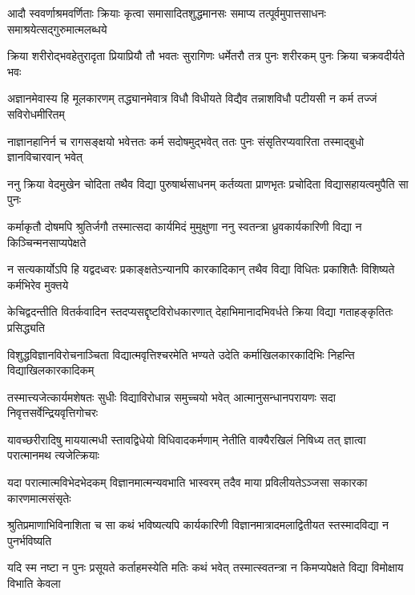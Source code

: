 \fourlineindentedshloka
{आदौ स्ववर्णाश्रमवर्णिताः क्रियाः}
{कृत्वा समासादितशुद्धमानसः}
{समाप्य तत्पूर्वमुपात्तसाधनः}
{समाश्रयेत्सद्गुरुमात्मलब्धये} %

\fourlineindentedshloka
{क्रिया शरीरोद्भवहेतुरादृता}
{प्रियाप्रियौ तौ भवतः सुरागिणः}
{धर्मेतरौ तत्र पुनः शरीरकम्}
{पुनः क्रिया चक्रवदीर्यते भवः} %

\fourlineindentedshloka
{अज्ञानमेवास्य हि मूलकारणम्}
{तद्ध्यानमेवात्र विधौ विधीयते}
{विद्यैव तन्नाशविधौ पटीयसी}
{न कर्म तज्जं सविरोधमीरितम्} %

\fourlineindentedshloka
{नाज्ञानहानिर्न च रागसङ्क्षयो}
{भवेत्ततः कर्म सदोषमुद्भवेत्}
{ततः पुनः संसृतिरप्यवारिता}
{तस्माद्बुधो ज्ञानविचारवान् भवेत्} %

\fourlineindentedshloka
{ननु क्रिया वेदमुखेन चोदिता}
{तथैव विद्या पुरुषार्थसाधनम्}
{कर्तव्यता प्राणभृतः प्रचोदिता}
{विद्यासहायत्वमुपैति सा पुनः} %

\fourlineindentedshloka
{कर्माकृतौ दोषमपि श्रुतिर्जगौ}
{तस्मात्सदा कार्यमिदं मुमुक्षुणा}
{ननु स्वतन्त्रा ध्रुवकार्यकारिणी}
{विद्या न किञ्चिन्मनसाप्यपेक्षते} %

\fourlineindentedshloka
{न सत्यकार्योऽपि हि यद्वदध्वरः}
{प्रकाङ्क्षतेऽन्यानपि कारकादिकान्}
{तथैव विद्या विधितः प्रकाशितैः}
{विशिष्यते कर्मभिरेव मुक्तये} %

\fourlineindentedshloka
{केचिद्वदन्तीति वितर्कवादिन\-}
{स्तदप्यसद्दृष्टविरोधकारणात्}
{देहाभिमानादभिवर्धते क्रिया}
{विद्या गताहङ्कृतितः प्रसिद्ध्यति} %

\fourlineindentedshloka
{विशुद्धविज्ञानविरोचनाञ्चिता}
{विद्यात्मवृत्तिश्चरमेति भण्यते}
{उदेति कर्माखिलकारकादिभिः}
{निहन्ति विद्याखिलकारकादिकम्} %

\fourlineindentedshloka
{तस्मात्त्यजेत्कार्यमशेषतः सुधीः}
{विद्याविरोधान्न समुच्चयो भवेत्}
{आत्मानुसन्धानपरायणः सदा}
{निवृत्तसर्वेन्द्रियवृत्तिगोचरः} %

\fourlineindentedshloka
{यावच्छरीरादिषु माययात्मधी\-}
{स्तावद्विधेयो विधिवादकर्मणाम्}
{नेतीति वाक्यैरखिलं निषिध्य तत्}
{ज्ञात्वा परात्मानमथ त्यजेत्क्रियाः} %

\fourlineindentedshloka
{यदा परात्मात्मविभेदभेदकम्}
{विज्ञानमात्मन्यवभाति भास्वरम्}
{तदैव माया प्रविलीयतेऽञ्जसा}
{सकारका कारणमात्मसंसृतेः} %

\fourlineindentedshloka
{श्रुतिप्रमाणाभिविनाशिता च सा}
{कथं भविष्यत्यपि कार्यकारिणी}
{विज्ञानमात्रादमलाद्वितीयत\-}
{स्तस्मादविद्या न पुनर्भविष्यति} %

\fourlineindentedshloka
{यदि स्म नष्टा न पुनः प्रसूयते}
{कर्ताहमस्येति मतिः कथं भवेत्}
{तस्मात्स्वतन्त्रा न किमप्यपेक्षते}
{विद्या विमोक्षाय विभाति केवला} %


